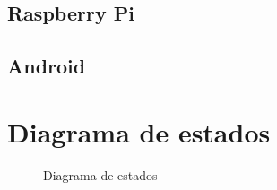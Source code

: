 \documentclass{article}
\begin{document}
\subsection{Raspberry Pi}
\subsection{Android}

\newpage
\section{Diagrama de estados}

    \begin{figure}[h!]
    \centering
    \caption{Diagrama de estados}
    \label{fig:diagEstados}
\end{figure}
\end{document}
